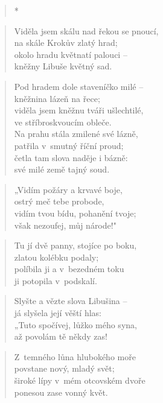 \begin{verse}
*
\end{verse}

\begin{verse}
Viděla jsem skálu nad řekou se pnoucí, \\
na skále Krokův zlatý hrad; \\
okolo hradu květnatí palouci -- \\
kněžny Libuše květný sad.
\end{verse}

\begin{verse}
Pod hradem dole staveníčko milé -- \\
kněžnina lázeň na řece; \\
viděla jsem kněžnu tváři ušlechtilé, \\
ve stříbroskvoucím obleče. \\
Na prahu stála zmilené své lázně, \\
patřila v~smutný říční proud; \\
četla tam slova naděje i bázně: \\
své milé země tajný soud.
\end{verse}

\begin{verse}
„Vidím požáry a krvavé boje, \\
ostrý meč tebe probode, \\
vidím tvou bídu, pohanění tvoje; \\
však nezoufej, můj národe!"
\end{verse}

\begin{verse}
Tu jí dvě panny, stojíce po boku, \\
zlatou kolébku podaly; \\
políbila ji a v~bezedném toku \\
ji potopila v~podskalí.
\end{verse}

\begin{verse}
Slyšte a vězte slova Libušina -- \\
já slyšela její věští hlas: \\
„Tuto spočívej, lůžko mého syna, \\
až povolám tě někdy zas!
\end{verse}

\begin{verse}
Z~temného lůna hlubokého moře \\
povstane nový, mladý svět; \\
široké lípy v~mém otcovském dvoře \\
ponesou zase vonný květ.
\end{verse}

